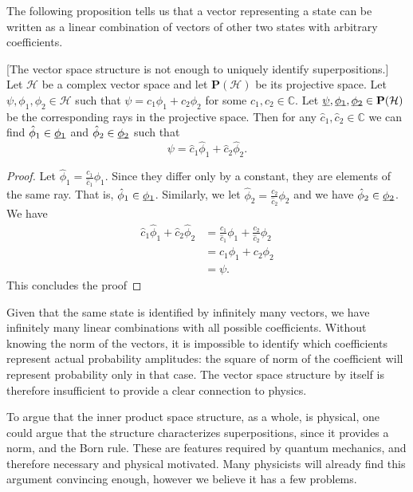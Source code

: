 \documentclass[10pt,twocolumn, nofootinbib]{revtex4-2}
\begin{document}
The following proposition tells us that a vector representing a state can be written as a linear combination of vectors of other two states with arbitrary coefficients.
\begin{prop}\label{vector_insufficient}[The vector space structure is not enough to uniquely identify superpositions.] Let $\mathcal{H}$ be a complex vector space and let $\textbf{P}(\mathcal{H})$ be its projective space. Let $\psi, \phi_1, \phi_2 \in \mathcal{H}$ such that $\psi = c_1 \phi_1 + c_2 \phi_2$ for some $c_1, c_2 \in \mathbb{C}$. Let $\underbar{$\psi$}, \underbar{$\phi_1$}, \underbar{$\phi_2$} \in \textbf{P}(\mathcal{H})$ be the corresponding rays in the projective space. Then for any $\hat{c}_1, \hat{c}_2 \in \mathbb{C}$ we can find $\hat{\phi}_1 \in \underbar{$\phi_1$}$ and $\hat{\phi}_2 \in \underbar{$\phi_2$}$ such that
$$\psi = \hat{c}_1 \hat{\phi}_1 + \hat{c}_2 \hat{\phi}_2.$$
\end{prop}

\begin{proof}
Let $\hat{\phi}_1 = \frac{c_1}{\hat{c}_1} \phi_1$. Since they differ only by a constant, they are elements of the same ray. That is, $\hat{\phi}_1 \in \underbar{$\phi_1$}$. Similarly, we let $\hat{\phi}_2 = \frac{c_2}{\hat{c}_2} \phi_2$ and we have $\hat{\phi}_2 \in \underbar{$\phi_2$}$. We have
\begin{equation}
\begin{aligned}
	\hat{c}_1 \hat{\phi}_1 + \hat{c}_2 \hat{\phi}_2 &= \frac{c_1}{\hat{c}_1} \phi_1 + \frac{c_2}{\hat{c}_2} \phi_2 \\
	&= c_1 \phi_1 + c_2 \phi_2 \\ 
	&= \psi.
	\end{aligned}
\end{equation}
This concludes the proof
\end{proof}

Given that the same state is identified by infinitely many vectors, we have infinitely many linear combinations with all possible coefficients. Without knowing the norm of the vectors, it is impossible to identify which coefficients represent actual probability amplitudes: the square of norm of the coefficient will represent probability only in that case. The vector space structure by itself is therefore insufficient to provide a clear connection to physics.

To argue that the inner product space structure, as a whole, is physical, one could argue that the structure characterizes superpositions, since it provides a norm, and the Born rule. These are features required by quantum mechanics, and therefore necessary and physical motivated. Many physicists will already find this argument convincing enough, however we believe it has a few problems.
\end{document}
